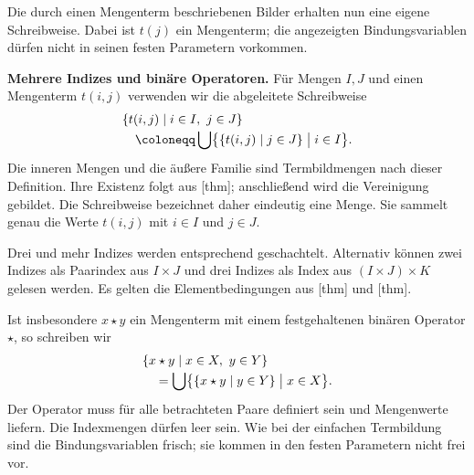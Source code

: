 Die durch einen Mengenterm beschriebenen Bilder erhalten nun eine eigene
Schreibweise. Dabei ist \(t(j)\) ein Mengenterm; die angezeigten
Bindungsvariablen dürfen nicht in seinen festen Parametern vorkommen.

\begin{tabproofwide}
\end{tabproofwide}

\medskip\noindent\textbf{Mehrere Indizes und binäre Operatoren.}
Für Mengen \(I,J\) und einen Mengenterm \(t(i,j)\) verwenden wir
die abgeleitete Schreibweise
\[
 \begin{aligned}
 &\{t(i,j)\mid i\in I,\ j\in J\}\\[-2pt]
 &\quad\coloneqq
   \bigcup\bigl\{\{t(i,j)\mid j\in J\}\bigm|i\in I\bigr\}.
 \end{aligned}
\]
Die inneren Mengen und die äußere Familie sind Termbildmengen nach
dieser Definition. Ihre Existenz folgt aus
[thm]; anschließend wird
die Vereinigung gebildet. Die Schreibweise bezeichnet daher eindeutig
eine Menge. Sie sammelt genau die Werte \(t(i,j)\) mit
\(i\in I\) und \(j\in J\).

Drei und mehr Indizes werden entsprechend geschachtelt.
Alternativ können zwei Indizes als Paarindex aus \(I\times J\)
und drei Indizes als Index aus \((I\times J)\times K\) gelesen werden.
Es gelten die Elementbedingungen aus
[thm]
und
[thm].

Ist insbesondere \(x\star y\) ein Mengenterm mit einem festgehaltenen
binären Operator \(\star\), so schreiben wir
\[
 \begin{aligned}
 &\{x\star y\mid x\in X,\ y\in Y\}\\[-2pt]
 &\quad=
   \bigcup\bigl\{\{x\star y\mid y\in Y\}\bigm|x\in X\bigr\}.
 \end{aligned}
\]
Der Operator muss für alle betrachteten Paare definiert sein und
Mengenwerte liefern. Die Indexmengen dürfen leer sein.
Wie bei der einfachen Termbildung sind die Bindungsvariablen frisch;
sie kommen in den festen Parametern nicht frei vor.

